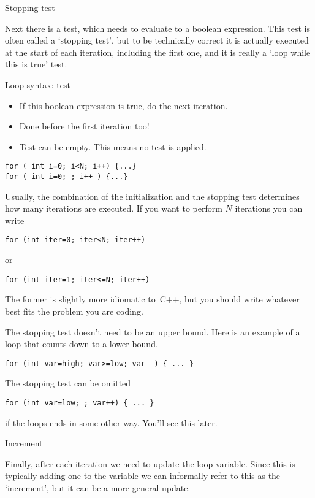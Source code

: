  {Stopping test}

Next there is a test,
which needs to evaluate to a boolean expression.
This test is often called a `stopping test',
but to be technically correct it is actually executed
at the start of each iteration, including the first one,
and it is really a `loop while this is true' test.
%

\begin{block}{Loop syntax: test}
  \label{sl:for-syntax2}
  \begin{itemize}
  \item If this boolean expression is true, do the next iteration.
  \item Done before the first iteration too!
  \item Test can be empty. This means no test is applied.
  \end{itemize}
\begin{lstlisting}
for ( int i=0; i<N; i++) {...}
for ( int i=0; ; i++ ) {...}
\end{lstlisting}
\end{block}

Usually, the combination of the initialization and the stopping test
determines how many iterations are executed.
If you want to perform $N$ iterations you can write
\begin{lstlisting}
for (int iter=0; iter<N; iter++)
\end{lstlisting}
or
\begin{lstlisting}
for (int iter=1; iter<=N; iter++)
\end{lstlisting}
The former is slightly more idiomatic to~C++,
but you should write whatever best fits the problem you are coding.

The stopping test doesn't need to be an upper bound. Here is an
  example of a loop that counts down to a lower bound.
\begin{lstlisting}
for (int var=high; var>=low; var--) { ... }
\end{lstlisting}

The stopping test can be omitted
\begin{lstlisting}
for (int var=low; ; var++) { ... }
\end{lstlisting}
if the loops ends in some other way. You'll see this later.

 {Increment}

Finally, after each iteration we need to update the loop variable.
Since this is typically adding one to the variable we can
informally refer to this as the `increment', but
it can be a more general update.

